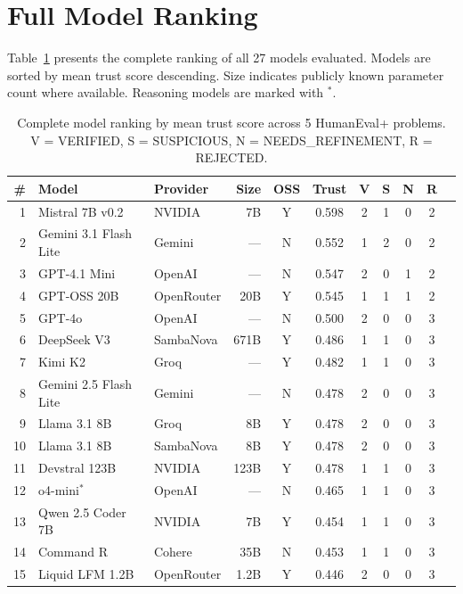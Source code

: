 \documentclass[conference]{IEEEtran}
\begin{document}
\section{Full Model Ranking}

Table~\ref{tab:full-ranking} presents the complete ranking of all 27 models evaluated. Models are sorted by mean trust score descending. Size indicates publicly known parameter count where available. Reasoning models are marked with $^*$.

\begin{table}[t]
\centering
\caption{Complete model ranking by mean trust score across 5 HumanEval+ problems.\\V = VERIFIED, S = SUSPICIOUS, N = NEEDS\_REFINEMENT, R = REJECTED.}
\label{tab:full-ranking}
\small
\begin{tabular}{rllrccccccc}
\toprule
\# & \textbf{Model} & \textbf{Provider} & \textbf{Size} & \textbf{OSS} & \textbf{Trust} & \textbf{V} & \textbf{S} & \textbf{N} & \textbf{R} \\
\midrule
1 & Mistral 7B v0.2 & NVIDIA & 7B & Y & 0.598 & 2 & 1 & 0 & 2 \\
2 & Gemini 3.1 Flash Lite & Gemini & --- & N & 0.552 & 1 & 2 & 0 & 2 \\
3 & GPT-4.1 Mini & OpenAI & --- & N & 0.547 & 2 & 0 & 1 & 2 \\
4 & GPT-OSS 20B & OpenRouter & 20B & Y & 0.545 & 1 & 1 & 1 & 2 \\
5 & GPT-4o & OpenAI & --- & N & 0.500 & 2 & 0 & 0 & 3 \\
6 & DeepSeek V3 & SambaNova & 671B & Y & 0.486 & 1 & 1 & 0 & 3 \\
7 & Kimi K2 & Groq & --- & Y & 0.482 & 1 & 1 & 0 & 3 \\
8 & Gemini 2.5 Flash Lite & Gemini & --- & N & 0.478 & 2 & 0 & 0 & 3 \\
9 & Llama 3.1 8B & Groq & 8B & Y & 0.478 & 2 & 0 & 0 & 3 \\
10 & Llama 3.1 8B & SambaNova & 8B & Y & 0.478 & 2 & 0 & 0 & 3 \\
11 & Devstral 123B & NVIDIA & 123B & Y & 0.478 & 1 & 1 & 0 & 3 \\
12 & o4-mini$^*$ & OpenAI & --- & N & 0.465 & 1 & 1 & 0 & 3 \\
13 & Qwen 2.5 Coder 7B & NVIDIA & 7B & Y & 0.454 & 1 & 1 & 0 & 3 \\
14 & Command R & Cohere & 35B & N & 0.453 & 1 & 1 & 0 & 3 \\
15 & Liquid LFM 1.2B & OpenRouter & 1.2B & Y & 0.446 & 2 & 0 & 0 & 3 \\

\end{tabular}
\end{table}
\end{document}
